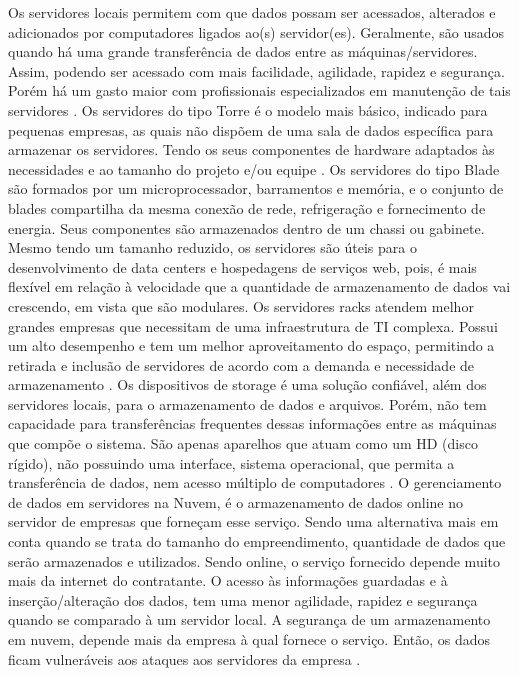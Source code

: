 Os servidores locais permitem com que dados possam ser acessados, alterados e adicionados por computadores ligados ao(s) servidor(es). Geralmente, são usados quando há uma grande transferência de dados entre as máquinas/servidores. Assim, podendo ser acessado com mais facilidade, agilidade, rapidez e segurança. Porém há um gasto maior com profissionais especializados em manutenção de tais servidores \cite{baguete}.
Os servidores do tipo Torre é o modelo mais básico, indicado para pequenas empresas, as quais não dispõem de uma sala de dados específica para armazenar os servidores. Tendo os seus componentes de hardware adaptados às necessidades e ao tamanho do projeto e/ou equipe \cite{anyconsulting}.
Os servidores do tipo Blade são formados por um microprocessador, barramentos e memória, e o conjunto de blades compartilha da mesma conexão de rede, refrigeração e fornecimento de energia. Seus componentes são armazenados dentro de um chassi ou gabinete. Mesmo tendo um tamanho reduzido, os servidores são úteis para o desenvolvimento de data centers e hospedagens de serviços web, pois, é mais flexível em relação à velocidade que a quantidade de armazenamento de dados vai crescendo, em vista que são modulares.
Os servidores racks atendem melhor grandes empresas que necessitam de uma infraestrutura de TI complexa. Possui um alto desempenho e tem um melhor aproveitamento do espaço, permitindo a retirada e inclusão de servidores de acordo com a demanda e necessidade de armazenamento \cite{anyconsulting}.
Os dispositivos de storage é uma solução confiável, além dos servidores locais, para o armazenamento de dados e arquivos. Porém, não tem capacidade para transferências frequentes dessas informações entre as máquinas que compõe o sistema. São apenas aparelhos que atuam como um HD (disco rígido), não possuindo uma interface, sistema operacional, que permita a transferência de dados, nem acesso múltiplo de computadores \cite{baguete}.
O gerenciamento de dados em servidores na Nuvem, é o armazenamento de dados online no servidor de empresas que forneçam esse serviço. Sendo uma alternativa mais em conta quando se trata do tamanho do empreendimento, quantidade de dados que serão armazenados e utilizados. Sendo online, o serviço fornecido depende muito mais da internet do contratante. O acesso às informações guardadas e à inserção/alteração dos dados, tem uma menor agilidade, rapidez e segurança quando se comparado à um servidor local. A segurança de um armazenamento em nuvem, depende mais da empresa à qual fornece o serviço. Então, os dados ficam vulneráveis aos ataques aos servidores da empresa \cite{baguete}.
